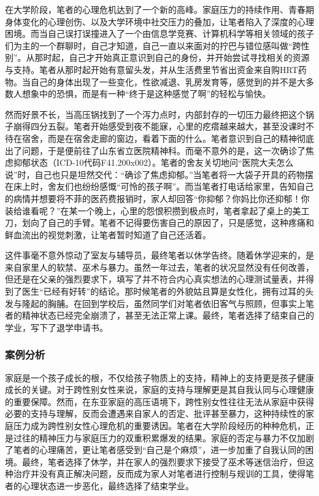\documentclass[twocolumn]{ctexart}
\begin{document}
在大学阶段，笔者的心理危机达到了一个新的高峰。家庭压力的持续作用、青春期身体变化的心理创伤、以及大学环境中社交压力的叠加，让笔者陷入了深度的心理困境。而当自己误打误撞进入了一个由信息学竞赛、计算机科学等相关领域的孩子们为主的一个群聊时，自己才知道，自己一直以来面对的拧巴与错位感叫做“跨性别”。从那时起，自己才开始真正意识到自己的身份，并开始尝试寻找相关的资源与支持。笔者从那时起开始有意留头发，并从生活费里节省出资金来自购HRT药物。当自己的身体出现了一些变化，性欲减退、乳房发育等，感觉到的并不是大多数人想象中的恐惧，而是有一种“终于是这种感觉了啊”的轻松与愉快。

然而好景不长，当高压锅找到了一个泻力点时，内部封存的一切压力最终把这个锅子崩得四分五裂。笔者开始感受到夜不能寐，心里的疙瘩越来越大，甚至没课时不待在宿舍，而是在宿舍走廊的窗边，看着下面的什么。笔者意识到自己的精神彻底出了问题，于是便前往了山东省立医院精神科。而毫不意外的是，这一次确诊了焦虑抑郁状态（ICD-10代码F41.200x002）\cite{ICD-10}。笔者的舍友关切地问“医院大夫怎么说”时，自己也只是坦然交代：“确诊了焦虑抑郁。”当笔者将一大袋子开具的药物摆在床上时，舍友们也纷纷感慨“可怜的孩子啊”。而当笔者打电话给家里，告知自己的病情并想要将不菲的医药费报销时，家人却回答“你抑郁？你妈比你还抑郁！你装给谁看呢？”在某一个晚上，心里的怨恨积攒到极点时，笔者拿起了桌上的美工刀，划向了自己的手臂。笔者不记得要伤害自己的原因了，只是感觉，这种疼痛和鲜血流出的视觉刺激，让笔者暂时知道了自己还活着。

这件事毫不意外惊动了室友与辅导员，最终笔者以休学告终。随着休学迎来的，是来自家里人的软禁、巫术与暴力。虽然一年过去，笔者的状况显然没有任何改善，但还是在父亲的强烈要求下，填写了并不符合内心真实想法的心理测试量表，并得到了医生“已经有好转”的结论。那时候笔者的外貌姑且算是女性化，拥有过耳的头发与隆起的胸脯。在回到学校后，虽然同学们对笔者依旧客气与照顾，但事实上笔者的精神状态已经完全崩溃了，甚至无法正常上课。最终，笔者选择了结束自己的学业，写下了退学申请书。

\subsubsection{案例分析}
家庭是一个孩子成长的根，不仅给孩子物质上的支持，精神上的支持更是孩子健康成长的关键。对于跨性别女性来说，家庭的支持与理解更是其自我认同与心理健康的重要保障。然而，在东亚家庭的高压语境下，跨性别女性往往无法从家庭中获得必要的支持与理解，反而会遭遇来自家人的否定、批评甚至暴力，这种持续性的家庭压力成为跨性别女性心理危机的重要诱因。笔者在大学阶段经历的种种危机，正是过往的精神压力与家庭压力的双重积累爆发的结果。家庭的否定与暴力不仅加剧了笔者的心理痛苦，更让笔者感受到“自己是个麻烦”，进一步加重了自我认同的困境。最终，笔者选择了休学，并在家人的强烈要求下接受了巫术等迷信治疗，但这种治疗并没有真正解决问题，反而成为家人对笔者进行控制与规训的工具，使得笔者的心理状态进一步恶化，最终选择了结束学业。
\end{document}
